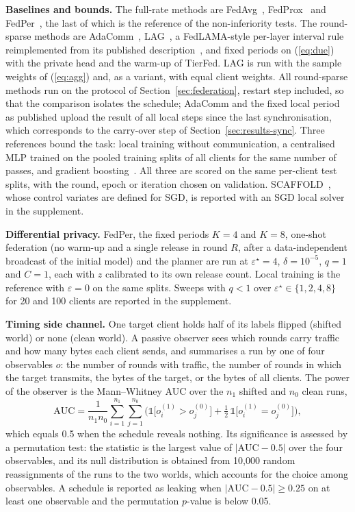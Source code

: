 \documentclass[journal]{IEEEtran}
\newcommand{\tierfed}{TierFed}
\begin{document}
\textbf{Baselines and bounds.} The full-rate methods are FedAvg~\cite{mcmahan2017}, FedProx~\cite{li2020fedprox} and FedPer~\cite{arivazhagan2019}, the last of which is the reference of the non-inferiority tests. The round-sparse methods are AdaComm~\cite{wang2019adacomm}, LAG~\cite{chen2018lag}, a FedLAMA-style per-layer interval rule reimplemented from its published description~\cite{lee2023fedlama}, and fixed periods on (\ref{eq:due}) with the private head and the warm-up of \tierfed{}. LAG is run with the sample weights of (\ref{eq:agg}) and, as a variant, with equal client weights. All round-sparse methods run on the protocol of Section~\ref{sec:federation}, restart step included, so that the comparison isolates the schedule; AdaComm and the fixed local period as published upload the result of all local steps since the last synchronisation, which corresponds to the carry-over step of Section~\ref{sec:results-sync}. Three references bound the task: local training without communication, a centralised MLP trained on the pooled training splits of all clients for the same number of passes, and gradient boosting~\cite{ke2017lightgbm}. All three are scored on the same per-client test splits, with the round, epoch or iteration chosen on validation. SCAFFOLD~\cite{karimireddy2020}, whose control variates are defined for SGD, is reported with an SGD local solver in the supplement.

\textbf{Differential privacy.} FedPer, the fixed periods $K=4$ and $K=8$, one-shot federation (no warm-up and a single release in round $R$, after a data-independent broadcast of the initial model) and the planner are run at $\varepsilon^\star=4$, $\delta=10^{-5}$, $q=1$ and $C=1$, each with $z$ calibrated to its own release count. Local training is the reference with $\varepsilon=0$ on the same splits. Sweeps with $q<1$ over $\varepsilon^\star\in\{1,2,4,8\}$ for 20 and 100 clients are reported in the supplement.

\textbf{Timing side channel.} One target client holds half of its labels flipped (shifted world) or none (clean world). A passive observer sees which rounds carry traffic and how many bytes each client sends, and summarises a run by one of four observables $o$: the number of rounds with traffic, the number of rounds in which the target transmits, the bytes of the target, or the bytes of all clients. The power of the observer is the Mann--Whitney AUC over the $n_1$ shifted and $n_0$ clean runs,
\begin{equation}
\mathrm{AUC}=\frac1{n_1n_0}\sum_{i=1}^{n_1}\sum_{j=1}^{n_0}\Big(\mathbb 1\big[o^{(1)}_i>o^{(0)}_j\big]+\tfrac12\,\mathbb 1\big[o^{(1)}_i=o^{(0)}_j\big]\Big),
\label{eq:auc}
\end{equation}
which equals 0.5 when the schedule reveals nothing. Its significance is assessed by a permutation test: the statistic is the largest value of $|\mathrm{AUC}-0.5|$ over the four observables, and its null distribution is obtained from 10,000 random reassignments of the runs to the two worlds, which accounts for the choice among observables. A schedule is reported as leaking when $|\mathrm{AUC}-0.5|\ge0.25$ on at least one observable and the permutation $p$-value is below 0.05.
\end{document}
